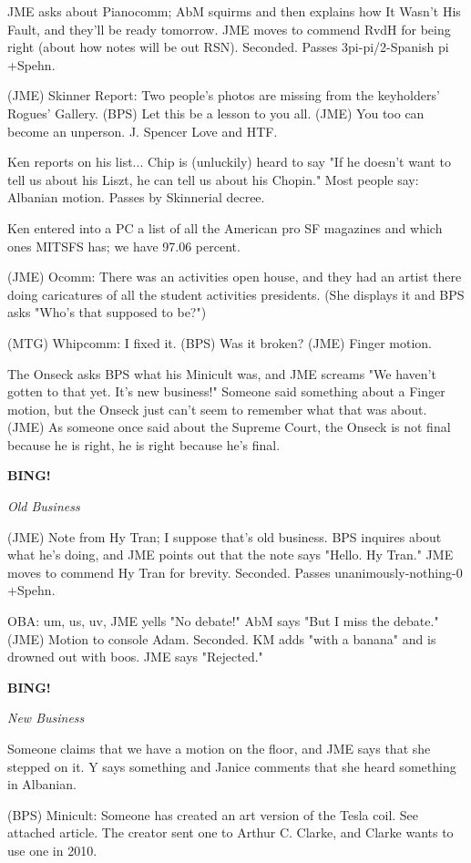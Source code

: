 \documentclass[12pt]{article}
\newcommand{\bing}{{\bf BING!} }
\newcommand{\goto}[1]{\bing \vskip 12pt \centerline{{\em{#1}}}}
\begin{document}
JME asks about Pianocomm; AbM squirms and then explains how It Wasn't His Fault, and they'll be ready tomorrow. JME moves to commend RvdH for being right (about how notes will be out RSN). Seconded. Passes 3pi-pi/2-Spanish pi +Spehn.

(JME) Skinner Report: Two people's photos are missing from the keyholders' Rogues' Gallery. (BPS) Let this be a lesson to you all. (JME) You too can become an unperson. J. Spencer Love and HTF.

Ken reports on his list... Chip is (unluckily) heard to say "If he doesn't want to tell us about his Liszt, he can tell us about his Chopin." Most people say: Albanian motion. Passes by Skinnerial decree.

Ken entered into a PC a list of all the American pro SF magazines and which ones MITSFS has; we have 97.06 percent.

(JME) Ocomm: There was an activities open house, and they had an artist there doing caricatures of all the student activities presidents. (She displays it and BPS asks "Who's that supposed to be?")

(MTG) Whipcomm: I fixed it. (BPS) Was it broken? (JME) Finger motion.

The Onseck asks BPS what his Minicult was, and JME screams "We haven't gotten to that yet. It's new business!" Someone said something about a Finger motion, but the Onseck just can't seem to remember what that was about. (JME) As someone once said about the Supreme Court, the Onseck is not final because he is right, he is right because he's final.

\goto{Old Business}

(JME) Note from Hy Tran; I suppose that's old business. BPS inquires about what he's doing, and JME points out that the note says "Hello. Hy Tran." JME moves to commend Hy Tran for brevity. Seconded. Passes unanimously-nothing-0 +Spehn.

OBA: um, us, uv, JME yells "No debate!" AbM says "But I miss the debate." (JME) Motion to console Adam. Seconded. KM adds "with a banana" and is drowned out with boos. JME says "Rejected."

\goto{New Business}

Someone claims that we have a motion on the floor, and JME says that she stepped on it. Y says something and Janice comments that she heard something in Albanian.

(BPS) Minicult: Someone has created an art version of the Tesla coil. See attached article. The creator sent one to Arthur C. Clarke, and Clarke wants to use one in 2010.
\end{document}
